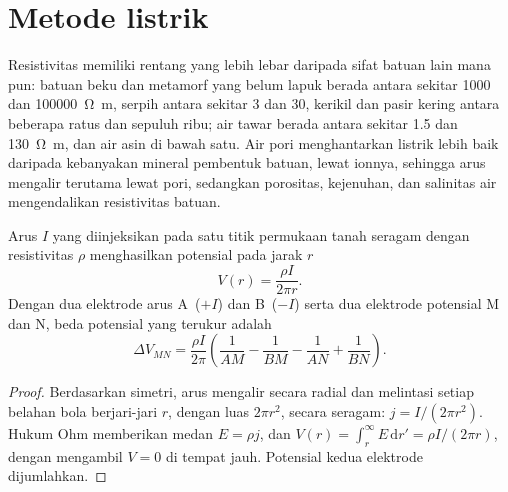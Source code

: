 \section{Metode listrik}\label{sec:b3:field-lab-methods-3:electrical}

Resistivitas memiliki rentang yang lebih lebar daripada sifat batuan lain mana pun:
batuan beku dan metamorf yang belum lapuk berada antara sekitar
\num{1000} dan \qty{100000}{\ohm\metre}, serpih antara sekitar
\num{3} dan \num{30}, kerikil dan pasir kering antara beberapa ratus dan sepuluh
ribu; air tawar berada antara sekitar \num{1.5} dan
\qty{130}{\ohm\metre}, dan air asin di bawah satu. Air pori menghantarkan
listrik lebih baik daripada kebanyakan mineral pembentuk batuan, lewat ionnya, sehingga arus
mengalir terutama lewat pori, sedangkan porositas, kejenuhan, dan
salinitas air mengendalikan resistivitas batuan.

\begin{theorem}\label{thm:b3:field-lab-methods-3:point-source}
Arus $I$ yang diinjeksikan pada satu titik permukaan tanah seragam dengan
resistivitas $\rho$ menghasilkan potensial pada jarak $r$
\[
V(r) = \frac{\rho I}{2\pi r} .
\]
Dengan dua elektrode arus A~($+I$) dan B~($-I$) serta dua
elektrode potensial M dan N, beda potensial yang terukur adalah
\[
\Delta V_{MN} = \frac{\rho I}{2\pi}\left(\frac{1}{AM} - \frac{1}{BM}
               - \frac{1}{AN} + \frac{1}{BN}\right) .
\]
\end{theorem}

\begin{proof}
Berdasarkan simetri, arus mengalir secara radial dan melintasi setiap belahan bola
berjari-jari $r$, dengan luas $2\pi r^2$, secara seragam: $j = I/(2\pi r^2)$. Hukum Ohm
memberikan medan $E = \rho j$, dan $V(r) = \int_r^\infty E\,\mathrm{d}r'
= \rho I/(2\pi r)$, dengan mengambil $V = 0$ di tempat jauh. Potensial kedua
elektrode dijumlahkan.
\end{proof}


